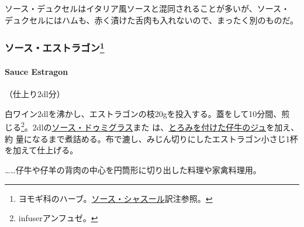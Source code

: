 \begin{recette}
ソース・デュクセルはイタリア風ソースと混同されることが多いが、ソース・
デュクセルにはハムも、赤く漬けた舌肉も入れないので、まったく別のものだ。

\maeaki

\hypertarget{ux30bdux30fcux30b9ux30a8ux30b9ux30c8ux30e9ux30b4ux30f399}{%
\subsubsection[ソース・エストラゴン]{\texorpdfstring{ソース・エストラゴン\footnote{ヨモギ科のハーブ。\protect\hyperlink{sauce-chasseur}{ソース・シャスール}訳注参照。}}{ソース・エストラゴン}}\label{ux30bdux30fcux30b9ux30a8ux30b9ux30c8ux30e9ux30b4ux30f399}}

\hypertarget{sauce-estragon}{%
\paragraph{Sauce Estragon}\label{sauce-estragon}}

   

（仕上り2\undemi{}dl分）

白ワイン2dlを沸かし、エストラゴンの枝20gを投入する。蓋をして10分間、煎
じる\footnote{infuserアンフュゼ。}。2\undemi{}dlの\protect\hyperlink{sauce-demi-glace}{ソース・ドゥミグラス}また
は、\protect\hyperlink{jus-de-veau-lie}{とろみを付けた仔牛のジュ}を加え、約\deuxtiers{}
量になるまで煮詰める。布で漉し、みじん切りにしたエストラゴン小さじ1杯
を加えて仕上げる。

\ldots{}\ldots{}仔牛や仔羊の背肉の中心を円筒形に切り出した料理や家禽料理用。

\maeaki

\hypertarget{ux30bdux30fcux30b9ux30d5ux30a3ux30caux30f3ux30b7ux30a8ux30fcux30eb34}{%
}
\end{recette}
